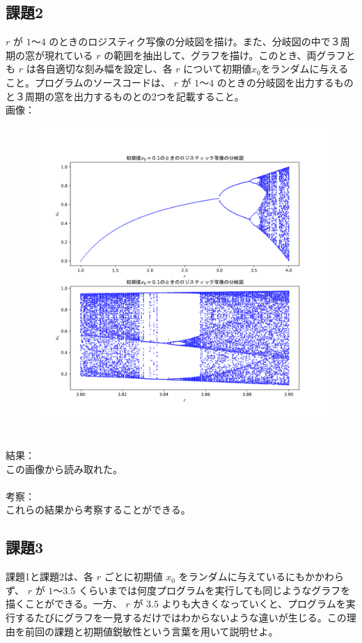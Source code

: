\subsection{課題2}
$r$ が $1～4$ のときのロジスティク写像の分岐図を描け。また、分岐図の中で３周期の窓が現れている $r$ の範囲を抽出して、グラフを描け。このとき、両グラフとも $r$ は各自適切な刻み幅を設定し、各 $r$ について初期値$x_0$をランダムに与えること。プログラムのソースコードは、 $r$ が $1～4$ のときの分岐図を出力するものと３周期の窓を出力するものとの2つを記載すること。\\
画像：\\
\begin{figure}[htbp]
  \centering
  \includegraphics[keepaspectratio, scale=0.6]{images/Problem3/ctest4.png}
\end{figure}
\\
結果：\\
この画像から読み取れた。\\\\
考察：\\
これらの結果から考察することができる。

\subsection{課題3}
課題1と課題2は、各 $r$ ごとに初期値 $x_0$ をランダムに与えているにもかかわらず、 $r$ が $1～3.5$ くらいまでは何度プログラムを実行しても同じようなグラフを描くことができる。一方、 $r$ が $3.5$ よりも大きくなっていくと、プログラムを実行するたびにグラフを一見するだけではわからないような違いが生じる。この理由を前回の課題と初期値鋭敏性という言葉を用いて説明せよ。